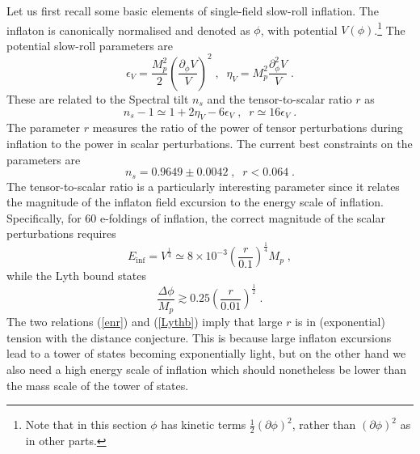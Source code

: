 \documentclass[11pt,a4paper]{article}
\numberwithin{equation}{section}
\numberwithin{table}{section}\setlength{\multlinegap}{25pt}
\newcommand{\be}{\begin{equation}}
\newcommand{\ee}{\end{equation}}
\begin{document}
Let us first recall some basic elements of single-field slow-roll inflation. The inflaton is canonically normalised and denoted as $\phi$, with potential $V\left(\phi\right)$.\footnote{Note that in this section $\phi$ has kinetic terms $\frac12 \left(\partial \phi\right)^2$, rather than $ \left(\partial \phi\right)^2$ as in other parts. } The potential slow-roll parameters are
\be
\epsilon_V = \frac{M_p^2}{2} \left( \frac{\partial_{\phi}V}{V} \right)^2 \;,\;\; \eta_V =  M_p^2 \frac{\partial^2_{\phi}V}{V}   \;.
\ee
These are related to the Spectral tilt $n_s$ and the tensor-to-scalar ratio $r$ as
\be
n_s-1 \simeq 1 + 2 \eta_V - 6 \epsilon_V \;,\;\; r \simeq 16 \epsilon_V \;.
\ee
The parameter $r$ measures the ratio of the power of tensor perturbations during inflation to the power in scalar perturbations. The current best constraints on the parameters are  \cite{Akrami:2018odb}
\be
n_s = 0.9649\pm 0.0042 \;,\;\; r < 0.064 \;.
\label{spetrbou}
\ee
The tensor-to-scalar ratio is a particularly interesting parameter since it relates the magnitude of the inflaton field excursion to the energy scale of inflation. Specifically, for 60 e-foldings of inflation, the correct magnitude of the scalar perturbations requires
\be
E_{\mathrm{inf}} = V^{\frac14} \simeq 8 \times 10^{-3} \left(\frac{r}{0.1} \right)^{\frac14} M_p \;,
\label{enr}
\ee
while the Lyth bound states \cite{Lyth:1996im}
\be
\frac{\Delta \phi}{M_p} \gtrsim 0.25 \left(\frac{r}{0.01} \right)^{\frac12} \;.
\label{Lythb}
\ee
The two relations (\ref{enr}) and (\ref{Lythb}) imply that large $r$ is in (exponential) tension with the distance conjecture. This is because large inflaton excursions lead to a tower of states becoming exponentially light, but on the other hand we also need a high energy scale of inflation which should nonetheless be lower than the mass scale of the tower of states. 
\end{document}
